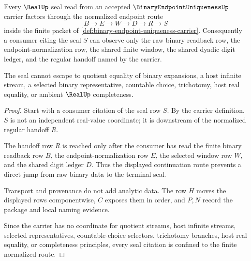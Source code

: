 \begin{theorem}
\label{thm:binary-endpoint-uniqueness-real-seal-nonescape}
Every $\RealUp$ seal read from an accepted $\BinaryEndpointUniquenessUp$ carrier factors through the normalized endpoint route
$$
B \longrightarrow E \longrightarrow W \longrightarrow D \longrightarrow R \longrightarrow S
$$
inside the finite packet of \autoref{def:binary-endpoint-uniqueness-carrier}. Consequently a consumer citing the seal $S$ can observe only the raw binary readback row, the endpoint-normalization row, the shared finite window, the shared dyadic digit ledger, and the regular handoff named by the carrier.

The seal cannot escape to quotient equality of binary expansions, a host infinite stream, a selected binary representative, countable choice, trichotomy, host real equality, or ambient $\RealUp$ completeness.
\end{theorem}
\begin{proof}
Start with a consumer citation of the seal row $S$. By the carrier definition, $S$ is not an independent real-value coordinate; it is downstream of the normalized regular handoff $R$.

The handoff row $R$ is reached only after the consumer has read the finite binary readback row $B$, the endpoint-normalization row $E$, the selected window row $W$, and the shared digit ledger $D$. Thus the displayed continuation route prevents a direct jump from raw binary data to the terminal seal.

Transport and provenance do not add analytic data. The row $H$ moves the displayed rows componentwise, $C$ exposes them in order, and $P,N$ record the package and local naming evidence.

Since the carrier has no coordinate for quotient streams, host infinite streams, selected representatives, countable-choice selectors, trichotomy branches, host real equality, or completeness principles, every seal citation is confined to the finite normalized route.
\end{proof}

